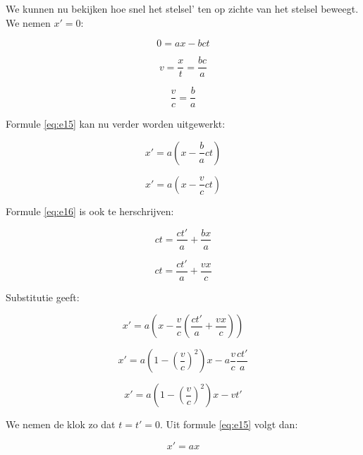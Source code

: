 \newpage{}

We kunnen nu bekijken hoe snel het stelsel' ten op zichte van het
stelsel beweegt. We nemen $x'=0$:

\begin{equation}
0=ax-bct
\end{equation}


\begin{equation}
v=\frac{x}{t}=\frac{bc}{a}
\end{equation}


\begin{equation}
\frac{v}{c}=\frac{b}{a}\label{eq:e19}
\end{equation}


Formule \ref{eq:e15} kan nu verder worden uitgewerkt:

\begin{equation}
x'=a\left(x-\frac{b}{a}ct\right)
\end{equation}


\begin{equation}
x'=a\left(x-\frac{v}{c}ct\right)
\end{equation}


Formule \ref{eq:e16} is ook te herschrijven:

\begin{equation}
ct=\frac{ct'}{a}+\frac{bx}{a}
\end{equation}


\begin{equation}
ct=\frac{ct'}{a}+\frac{vx}{c}
\end{equation}


Substitutie geeft:

\begin{equation}
x'=a\left(x-\frac{v}{c}\left(\frac{ct'}{a}+\frac{vx}{c}\right)\right)
\end{equation}


\begin{equation}
x'=a\left(1-\left(\frac{v}{c}\right)^{2}\right)x-a\frac{v}{c}\frac{ct'}{a}
\end{equation}


\begin{equation}
x'=a\left(1-\left(\frac{v}{c}\right)^{2}\right)x-vt'\label{eq:e26}
\end{equation}


We nemen de klok zo dat $t=t'=0$. Uit formule \ref{eq:e15} volgt
dan:

\begin{equation}
x'=ax
\end{equation}



